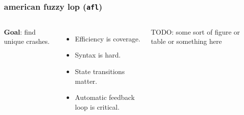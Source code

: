 \begin{frame}
\frametitle{american fuzzy lop (\texttt{afl})}

\begin{columns}[c]


\textbf{Goal}: find unique crashes.

\begin{itemize}
    \item Efficiency is coverage.
    \item Syntax is hard.
    \item State transitions matter.
    \item Automatic feedback loop is critical.
\end{itemize}


TODO: some sort of figure or table or something here

\end{columns}

\end{frame}
